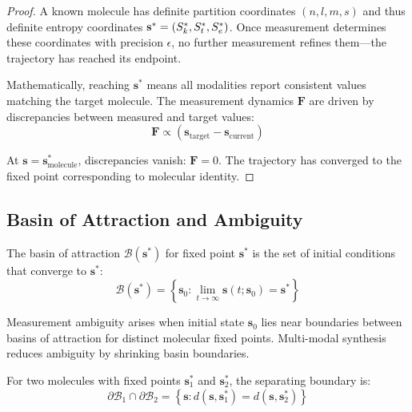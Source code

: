 \begin{proof}
A known molecule has definite partition coordinates $(n,l,m,s)$ and thus definite entropy coordinates $\mathbf{s}^* = (S_k^*, S_t^*, S_e^*)$. Once measurement determines these coordinates with precision $\epsilon$, no further measurement refines them—the trajectory has reached its endpoint.

Mathematically, reaching $\mathbf{s}^*$ means all modalities report consistent values matching the target molecule. The measurement dynamics $\mathbf{F}$ are driven by discrepancies between measured and target values:
\begin{equation}
\mathbf{F} \propto (\mathbf{s}_{\text{target}} - \mathbf{s}_{\text{current}})
\end{equation}

At $\mathbf{s} = \mathbf{s}^*_{\text{molecule}}$, discrepancies vanish: $\mathbf{F} = 0$. The trajectory has converged to the fixed point corresponding to molecular identity.
\end{proof}

\subsection{Basin of Attraction and Ambiguity}

\begin{definition}
\label{def:basin}
The basin of attraction $\mathcal{B}(\mathbf{s}^*)$ for fixed point $\mathbf{s}^*$ is the set of initial conditions that converge to $\mathbf{s}^*$:
\begin{equation}
\mathcal{B}(\mathbf{s}^*) = \left\{\mathbf{s}_0 : \lim_{t \to \infty} \mathbf{s}(t; \mathbf{s}_0) = \mathbf{s}^*\right\}
\end{equation}
\end{definition}

\begin{proposition}
\label{prop:ambiguity_basin}
Measurement ambiguity arises when initial state $\mathbf{s}_0$ lies near boundaries between basins of attraction for distinct molecular fixed points. Multi-modal synthesis reduces ambiguity by shrinking basin boundaries.
\end{proposition}

For two molecules with fixed points $\mathbf{s}^*_1$ and $\mathbf{s}^*_2$, the separating boundary is:
\begin{equation}
\partial\mathcal{B}_1 \cap \partial\mathcal{B}_2 = \left\{\mathbf{s} : d(\mathbf{s}, \mathbf{s}^*_1) = d(\mathbf{s}, \mathbf{s}^*_2)\right\}
\end{equation}

